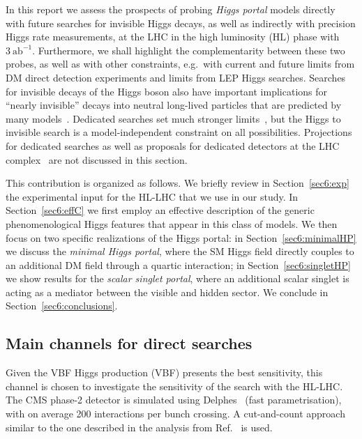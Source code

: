 \documentclass[../report.tex]{subfiles}
\begin{document}
In this report we assess the prospects of probing \emph{Higgs portal} models directly with future searches for invisible Higgs decays, as well as indirectly with precision Higgs rate measurements, at the LHC in the high luminosity (HL) phase with $3~\mathrm{ab}^{-1}$. Furthermore, we shall highlight the complementarity between these two probes, as well as with other constraints, e.g.~with current and future limits from DM direct detection experiments and limits from LEP Higgs searches. Searches for invisible decays of the Higgs boson also have important implications for ``nearly invisible'' decays into neutral long-lived particles that are predicted by many models~\cite{Curtin:2018mvb}. Dedicated searches set much stronger limits~\cite{Aad:2015uaa,ATLAS:2016jza,Aaij:2016xmb,CMS:2014hka}, but the Higgs to invisible search is a model-independent constraint on all possibilities.  Projections for dedicated searches as well as proposals for dedicated detectors at the LHC complex~\cite{Chou:2016lxi,Gligorov:2017nwh} are not discussed in this section.

This contribution is organized as follows. We briefly review in Section~\ref{sec6:exp} the experimental input for the HL-LHC that we use in our study. In Section~\ref{sec6:effC} we first employ an effective description of the generic phenomenological Higgs features that appear in this class of models. We then focus on two specific realizations of the Higgs portal: in Section~\ref{sec6:minimalHP} we discuss the \emph{minimal Higgs portal}, where the SM Higgs field directly couples to an additional DM field through a quartic interaction; in Section~\ref{sec6:singletHP} we show results for the \emph{scalar singlet portal}, where an additional scalar singlet is acting as a mediator between the visible and hidden sector. We conclude in Section~\ref{sec6:conclusions}.


\subsection{Main channels for direct searches}\label{sec:expinp}

Given the VBF Higgs production (VBF\PH) presents the best sensitivity, this channel is chosen to investigate the sensitivity of the search with the HL-LHC. The CMS phase-2 detector is simulated using Delphes~\cite{deFavereau:2013fsa} (fast parametrisation), with on average 200 interactions per bunch crossing.  A
cut-and-count approach similar to the one described in the analysis from Ref.~\cite{Sirunyan:2018owy} is used.
\end{document}

